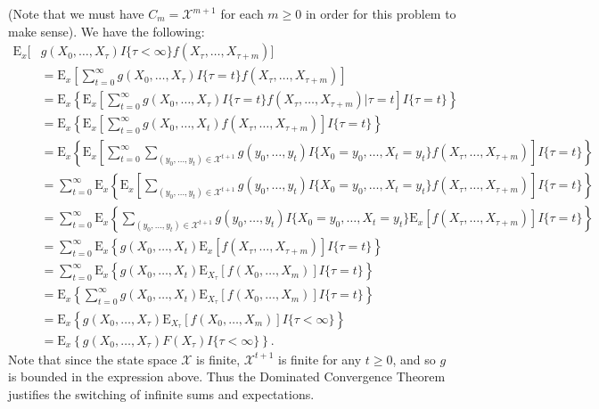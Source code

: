 \documentclass[12pt]{article}
\newcommand{\E}{\mathrm{E}}
\begin{document}
(Note that we must have $C_m = \mathcal{X}^{m+1}$ for each $m \geq 0$ in order for this problem to make sense). We have the following:
\begin{align*}
\E_x[&g(X_0, \ldots, X_\tau) I\{\tau < \infty\} f(X_\tau, \ldots, X_{\tau+m})] \\
&= \E_x\left[\sum_{t=0}^\infty g(X_0, \ldots, X_\tau) I\{\tau = t\} f(X_\tau, \ldots, X_{\tau+m})\right] \\
&= \E_x \left\{ \E_x\left[\sum_{t=0}^\infty g(X_0, \ldots, X_\tau) I\{\tau = t\} f(X_\tau, \ldots, X_{\tau+m}) | \tau = t \right] I\{\tau = t\} \right \} \\
&= \E_x \left\{ \E_x\left[\sum_{t=0}^\infty g(X_0, \ldots, X_t) f(X_\tau, \ldots, X_{\tau+m})\right] I\{\tau = t\} \right \} \\
&= \E_x \left\{ \E_x\left[\sum_{t=0}^\infty \sum_{(y_0, \ldots, y_t) \in \mathcal{X}^{t+1}} g(y_0, \ldots, y_t) I\{X_0 = y_0, \ldots, X_t = y_t\} f(X_\tau, \ldots, X_{\tau+m})\right] I\{\tau = t\} \right \} \\
&= \sum_{t=0}^\infty \E_x \left\{ \E_x\left[\sum_{(y_0, \ldots, y_t) \in \mathcal{X}^{t+1}} g(y_0, \ldots, y_t) I\{X_0 = y_0, \ldots, X_t = y_t\} f(X_\tau, \ldots, X_{\tau+m})\right] I\{\tau = t\} \right \} \\
&= \sum_{t=0}^\infty \E_x \left\{ \sum_{(y_0, \ldots, y_t) \in \mathcal{X}^{t+1}} g(y_0, \ldots, y_t) I\{X_0 = y_0, \ldots, X_t = y_t\} \E_x\left[ f(X_\tau, \ldots, X_{\tau+m})\right] I\{\tau = t\} \right \} \\
&= \sum_{t=0}^\infty \E_x \left\{g(X_0, \ldots, X_t) \E_x\left[ f(X_\tau, \ldots, X_{\tau+m})\right] I\{\tau = t\} \right \} \\
&= \sum_{t=0}^\infty \E_x \left\{g(X_0, \ldots, X_t) \E_{X_\tau}\left[ f(X_0, \ldots, X_m)\right] I\{\tau = t\} \right \} \\
&= \E_x \left\{\sum_{t=0}^\infty g(X_0, \ldots, X_t) \E_{X_\tau}\left[ f(X_0, \ldots, X_m)\right] I\{\tau = t\} \right \} \\
&= \E_x \left\{g(X_0, \ldots, X_\tau) \E_{X_\tau}\left[ f(X_0, \ldots, X_m)\right] I\{\tau < \infty\} \right \} \\
&= \E_x \left\{g(X_0, \ldots, X_\tau) F(X_\tau) I\{\tau < \infty\} \right \}.
\end{align*}
Note that since the state space $\mathcal{X}$ is finite, $\mathcal{X}^{t+1}$ is finite for any $t \geq 0$, and so $g$ is bounded in the expression above. Thus the Dominated Convergence Theorem justifies the switching of infinite sums and expectations.
\end{document}
